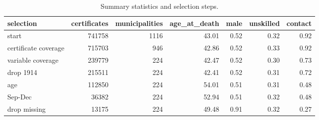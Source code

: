 \begin{table}

\caption{\label{tab:tab:sumselect}Summary statistics and selection steps.}
\centering
\begin{tabular}[t]{l|r|r|r|r|r|r}
\hline
selection & certificates & municipalities & age\_at\_death & male & unskilled & contact\\
\hline
start & 741758 & 1116 & 43.01 & 0.52 & 0.32 & 0.92\\
\hline
certificate coverage & 715703 & 946 & 42.86 & 0.52 & 0.33 & 0.92\\
\hline
variable coverage & 239779 & 224 & 42.47 & 0.52 & 0.30 & 0.73\\
\hline
drop 1914 & 215511 & 224 & 42.41 & 0.52 & 0.31 & 0.72\\
\hline
age & 112850 & 224 & 54.01 & 0.51 & 0.31 & 0.48\\
\hline
Sep-Dec & 36382 & 224 & 52.94 & 0.51 & 0.32 & 0.48\\
\hline
drop missing & 13175 & 224 & 49.48 & 0.91 & 0.32 & 0.27\\
\hline
\end{tabular}
\end{table}

